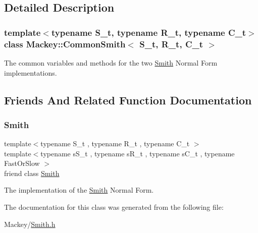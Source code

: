 \subsection{Detailed Description}
\subsubsection*{template$<$typename S\+\_\+t, typename R\+\_\+t, typename C\+\_\+t$>$\newline
class Mackey\+::\+Common\+Smith$<$ S\+\_\+t, R\+\_\+t, C\+\_\+t $>$}

The common variables and methods for the two \hyperlink{classMackey_1_1Smith}{Smith} Normal Form implementations. 

\subsection{Friends And Related Function Documentation}
\mbox{\label{classMackey_1_1CommonSmith_aa10f0f4c3408f3557b07883e86efc88a}} 
\subsubsection{\texorpdfstring{Smith}{Smith}}
{\footnotesize\ttfamily template$<$typename S\+\_\+t , typename R\+\_\+t , typename C\+\_\+t $>$ \\
template$<$typename s\+S\+\_\+t , typename s\+R\+\_\+t , typename s\+C\+\_\+t , typename Fast\+Or\+Slow $>$ \\
friend class \hyperlink{classMackey_1_1Smith}{Smith}\hspace{0.3cm}{\ttfamily [friend]}}



The implementation of the \hyperlink{classMackey_1_1Smith}{Smith} Normal Form. 



The documentation for this class was generated from the following file\+:\begin{DoxyCompactItemize}
\item 
Mackey/\hyperlink{Smith_8h}{Smith.\+h}\end{DoxyCompactItemize}
